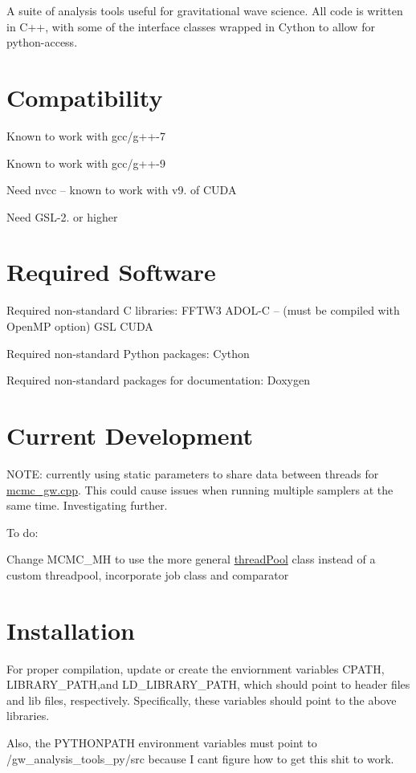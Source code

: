 A suite of analysis tools useful for gravitational wave science. All code is written in C++, with some of the interface classes wrapped in Cython to allow for python-\/access.\hypertarget{index_compat}{}\section{Compatibility}\label{index_compat}
Known to work with gcc/g++-\/7

Known to work with gcc/g++-\/9

Need nvcc -- known to work with v9. of C\+U\+DA

Need G\+S\+L-\/2. or higher\hypertarget{index_external_libs}{}\section{Required Software}\label{index_external_libs}
Required non-\/standard C libraries\+: F\+F\+T\+W3 A\+D\+O\+L-\/C -- (must be compiled with Open\+MP option) G\+SL C\+U\+DA

Required non-\/standard Python packages\+: Cython

Required non-\/standard packages for documentation\+: Doxygen\hypertarget{index_dev}{}\section{Current Development}\label{index_dev}
N\+O\+TE\+: currently using static parameters to share data between threads for \hyperlink{mcmc__gw_8cpp}{mcmc\+\_\+gw.\+cpp}. This could cause issues when running multiple samplers at the same time. Investigating further.

To do\+:

Change M\+C\+M\+C\+\_\+\+MH to use the more general \hyperlink{classthreadPool}{thread\+Pool} class instead of a custom threadpool, incorporate job class and comparator\hypertarget{index_installation}{}\section{Installation}\label{index_installation}
For proper compilation, update or create the enviornment variables C\+P\+A\+TH, L\+I\+B\+R\+A\+R\+Y\+\_\+\+P\+A\+TH,and L\+D\+\_\+\+L\+I\+B\+R\+A\+R\+Y\+\_\+\+P\+A\+TH, which should point to header files and lib files, respectively. Specifically, these variables should point to the above libraries.

Also, the P\+Y\+T\+H\+O\+N\+P\+A\+TH environment variables must point to /gw\+\_\+analysis\+\_\+tools\+\_\+py/src because I can\textquotesingle{}t figure how to get this shit to work.

